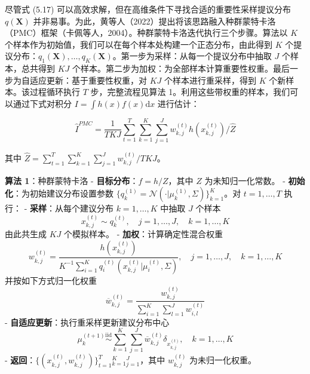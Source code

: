 \documentclass{ctexart}
\begin{document}
尽管式 (5.17) 可以高效求解，但在高维条件下寻找合适的重要性采样提议分布 $q(\boldsymbol{X})$ 并非易事。为此，黄等人（2022）提出将该思路融入种群蒙特卡洛（PMC）框架（卡佩等人，2004）。种群蒙特卡洛迭代执行三个步骤。算法以 $K$ 个样本作为初始值，我们可以在每个样本处构建一个正态分布，由此得到 $K$ 个提议分布：$q_1(\boldsymbol{X}),\dots,q_K(\boldsymbol{X})$。第一步为采样：从每一个提议分布中抽取 $J$ 个样本，总共得到 $KJ$ 个样本。第二步为加权：为全部样本计算重要性权重。最后一步为自适应更新：基于重要性权重，对 $KJ$ 个样本进行重采样，得到 $K$ 个新样本。该过程循环执行 $T$ 步，完整流程见算法 1。利用这些带权重的样本，我们可以通过下式对积分 $I=\int h(x)f(x)\mathrm{d}x$ 进行估计：

\begin{equation*}
\widehat{I}^{PMC}=\frac{1}{TKJ}\sum_{t=1}^{T}\sum_{k=1}^{K}\sum_{j=1}^{J}w_{k,j}^{(t)}h(x_{k,j}^{(t)})/\widehat{Z}
\end{equation*}

其中 $\widehat{Z}=\sum_{t=1}^{T}\sum_{k=1}^{K}\sum_{j=1}^{J}w_{k,j}^{(t)}/TKJ$。

\begin{mdquote}
\textbf{算法 1}：种群蒙特卡洛
- \textbf{目标分布}：$f=h/Z$，其中 $Z$ 为未知归一化常数。
- \textbf{初始化}：为初始建议分布设置参数 $\{q^{(1)}_k=\mathcal{N}(\cdot|\mu^{(1)}_k,\Sigma)\}_{k=1}^K$。对 $t=1,\dots,T$ 执行：
  - \textbf{采样}：从每个建议分布 $k=1,\dots,K$ 中抽取 $J$ 个样本 \begin{equation*}
x^{(t)}_{k,j}\sim q^{(t)}_k,\quad j=1,\dots,J,\quad k=1,\dots,K
\end{equation*} 由此共生成 $KJ$ 个模拟样本。
  - \textbf{加权}：计算确定性混合权重 \begin{equation*}
w^{(t)}_{k,j}=\frac{h(x^{(t)}_{k,j})}{K^{-1}\sum_{i=1}^Kq^{(t)}_i(x^{(t)}_{k,j}|\mu^{(t)}_i,\Sigma)},\quad j=1,\dots,J,\quad k=1,\dots,K
\end{equation*} 并按如下方式归一化权重 \begin{equation*}
\overline{w}^{(t)}_{k,j}=\frac{w^{(t)}_{k,j}}{\sum_{i=1}^K\sum_{l=1}^Jw^{(t)}_{i,l}}
\end{equation*}
  - \textbf{自适应更新}：执行重采样更新建议分布中心 \begin{equation*}
\mu^{(t+1)}_k\stackrel{\text{iid}}{\sim}\sum_{k=1}^K\sum_{j=1}^J\overline{w}^{(t)}_{k,j}\delta_{x^{(t)}_{k,j}},\quad k=1,\dots,K
\end{equation*}
- \textbf{返回}：$\{(x^{(t)}_{k,j},w^{(t)}_{k,j})\}_{t=1}^T{}_{k=1}^K{}_{j=1}^J$，其中 $w^{(t)}_{k,j}$ 为未归一化权重。
\end{mdquote}
\end{document}
